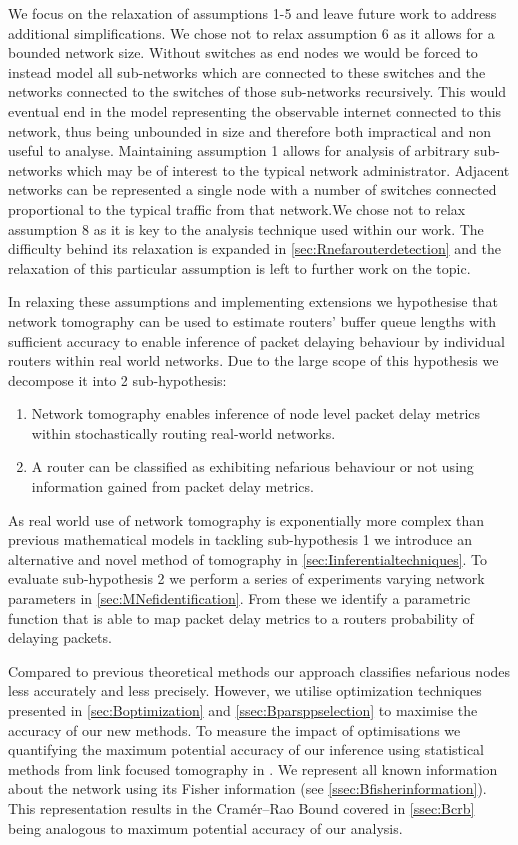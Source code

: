 We focus on the relaxation of assumptions 1-5 and leave future work to address additional simplifications. We chose not to relax assumption 6 as it allows for a bounded network size. Without switches as end nodes we would be forced to instead model all sub-networks which are connected to these switches and the networks connected to the switches of those sub-networks recursively. This would eventual end in the model representing the observable internet connected to this network, thus being unbounded in size and therefore both impractical and non useful to analyse. Maintaining assumption 1 allows for analysis of arbitrary sub-networks which may be of interest to the typical network administrator. Adjacent networks can be represented a single node with a number of switches connected proportional to the typical traffic from that network.We chose not to relax assumption 8 as it is key to the analysis technique used within our work. The difficulty behind its relaxation is expanded in \cref{sec:Rnefarouterdetection} and the relaxation of this particular assumption is left to further work on the topic.\par
In relaxing these assumptions and implementing extensions we hypothesise that network tomography can be used to estimate routers' buffer queue lengths with sufficient accuracy to enable inference of packet delaying behaviour by individual routers within real world networks. Due to the large scope of this hypothesis we decompose it into 2 sub-hypothesis:
\begin{enumerate}
    \item Network tomography enables inference of node level packet delay metrics within stochastically routing real-world networks.
    \item A router can be classified as exhibiting nefarious behaviour or not using information gained from packet delay metrics.
\end{enumerate}
As real world use of network tomography is exponentially more complex than previous mathematical models in tackling sub-hypothesis 1 we introduce an alternative and novel method of \pdv tomography in \cref{sec:Iinferentialtechniques}. To evaluate sub-hypothesis 2 we perform a series of experiments varying network parameters in \cref{sec:MNefidentification}. From these we identify a parametric function that is able to map packet delay metrics to a routers probability of delaying packets.\par
Compared to previous theoretical methods our approach classifies nefarious nodes less accurately and less precisely. However, we utilise optimization techniques presented in \cref{sec:Boptimization} and \cref{ssec:Bparsppselection} to maximise the accuracy of our new methods. To measure the impact of optimisations we quantifying the maximum potential accuracy of our inference using statistical methods from link focused tomography in \cite{he_fisher_2015}. We represent all known information about the network using its Fisher information (see \cref{ssec:Bfisherinformation}). This representation results in the Cramér–Rao Bound covered in \cref{ssec:Bcrb} being analogous to maximum potential accuracy of our analysis.\par
